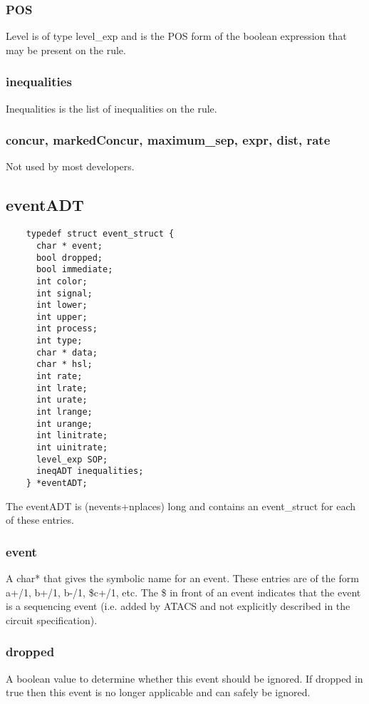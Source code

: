 \documentclass[titlepage,11pt]{article}
\begin{document}
  \subsubsection{POS}
  Level is of type level\_exp and is the POS form of the boolean
  expression that may be present on the rule.

  \subsubsection{inequalities}
	Inequalities is the list of inequalities on the rule.

  \subsubsection{concur, markedConcur, maximum\_sep, expr, dist, rate}
  Not used by most developers.
  
  \subsection{eventADT}
  \begin{verbatim}
    typedef struct event_struct {
      char * event;
      bool dropped;
      bool immediate;
      int color;
      int signal;
      int lower;
      int upper;
      int process;
      int type;
      char * data;
      char * hsl;
      int rate;
      int lrate;
      int urate;
      int lrange;
      int urange;
      int linitrate;
      int uinitrate;
      level_exp SOP;
      ineqADT inequalities;
    } *eventADT;
  \end{verbatim}

  The eventADT is (nevents+nplaces) long and contains an event\_struct
  for each of these entries.

  \subsubsection{event}
  A char* that gives the symbolic name for an event.  These entries
  are of the form a+/1, b+/1, b-/1, \$c+/1, etc.  The \$ in front of an
  event indicates that the event is a sequencing event (i.e. added by
  ATACS and not explicitly described in the circuit specification).  
  
  \subsubsection{dropped}
  A boolean value to determine whether this event should be ignored.
  If dropped in true then this event is no longer applicable and can
  safely be ignored.
  
\end{document}
